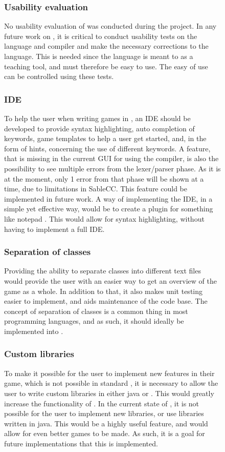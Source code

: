 \begin{figure}
\subsubsection{Usability evaluation}
No usability evaluation of \lang{} was conducted during the project. In any future work on \lang{}, it is critical to conduct usability tests on the \lang{} language and compiler and make the necessary corrections to the language. This is needed since the language is meant to as a teaching tool, and must therefore be easy to use. The easy of use can be controlled using these tests.

\subsubsection{IDE}
To help the user when writing games in \lang{}, an IDE should be developed to provide syntax highlighting, auto completion of keywords, game templates to help a user get started, and, in the form of hints, concerning the use of different keywords. A feature, that is missing in the current GUI for using the compiler, is also the possibility to see multiple errors from the lexer/parser phase. As it is at the moment, only 1 error from that phase will be shown at a time, due to limitations in SableCC. This feature could be implemented in future work.\newline
A way of implementing the IDE, in a simple yet effective way, would be to create a plugin for something like notepad \cite{notepad}. This would allow for syntax highlighting, without having to implement a full IDE. 

\subsubsection{Separation of classes}
Providing the ability to separate classes into different text files would provide the user with an easier way to get an overview of the game as a whole. In addition to that, it also makes unit testing easier to implement, and aids maintenance of the code base. 
The concept of separation of classes is a common thing in most programming languages, and as such, it should ideally be implemented into \lang{}.

\subsubsection{Custom libraries}
To make it possible for the user to implement new features in their game, which is not possible in standard \lang{}, it is necessary to allow the user to write custom libraries in either java or \lang{}. This would greatly increase the functionality of \lang{}.
In the current state of \lang{}, it is not possible for the user to implement new libraries, or use libraries written in java. This would be a highly useful feature, and would allow for even better games to be made. As such, it is a goal for future implementations that this is implemented. 


\end{figure}
